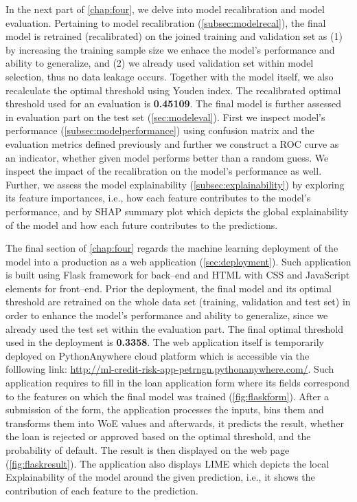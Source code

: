 In the next part of \autoref{chap:four}, we delve into model recalibration and model evaluation.
Pertaining to model recalibration (\autoref{subsec:modelrecal}), the final model is retrained (recalibrated) on the joined training and validation set as (1) by increasing the training sample size we enhace the model's performance and ability to generalize, and (2) we already used validation set within model selection, thus no data leakage occurs. Together with the model itself, we also recalculate the optimal threshold using Youden index.
The recalibrated optimal threshold used for an evaluation is \textbf{0.45109}.
The final model is further assessed in evaluation part on the test set (\autoref{sec:modeleval}).
First we inspect model's performance (\autoref{subsec:modelperformance}) using confusion matrix and the evaluation metrics defined previously and further we construct a ROC curve as an indicator, whether given model performs better than a random guess.
We inspect the impact of the recalibration on the model's performance as well.
Further, we assess the model explainability (\autoref{subsec:explainability}) by exploring its feature importances, i.e., how each feature contributes to the model's performance, and by SHAP summary plot which depicts the global explainability of the model and how each future contributes to the predictions.

The final section of \autoref{chap:four} regards the machine learning deployment of the model into a production as a web application (\autoref{sec:deployment}).
Such application is built using Flask framework for back--end and HTML with CSS and JavaScript elements for front--end.
Prior the deployment, the final model and its optimal threshold are retrained on the whole data set (training, validation and test set) in order to enhance the model's performance and ability to generalize, since we already used the test set within the evaluation part. The final optimal threshold used in the deployment is \textbf{0.3358}.
The web application itself is temporarily deployed on PythonAnywhere cloud platform which is accessible via the folllowing link: \url{http://ml-credit-risk-app-petrngn.pythonanywhere.com/}.
Such application requires to fill in the loan application form where its fields correspond to the features on which the final model was trained (\autoref{fig:flaskform}). After a submission of the form, the application processes the inputs, bins them and transforms them into WoE values and afterwards, it predicts the result, whether the loan is rejected or approved based on the optimal threshold, and the probability of default. The result is then displayed on the web page (\autoref{fig:flaskresult}).
The application also displays LIME which depicts the local Explainability of the model around the given prediction, i.e., it shows the contribution of each feature to the prediction.





